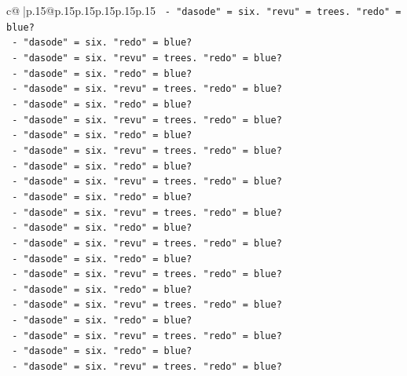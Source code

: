\documentclass{article}
\begin{document}
{\begin{supertabular}{c@{$\;$}|p{.15\linewidth}@{}p{.15\linewidth}p{.15\linewidth}p{.15\linewidth}p{.15\linewidth}p{.15\linewidth}}
{{{\texttt{                    {-} "dasode" = six. "revu" = trees. "redo" = blue?} \\
\texttt{                    {-} "dasode" = six. "redo" = blue?} \\
\texttt{                    {-} "dasode" = six. "revu" = trees. "redo" = blue?} \\
\texttt{                    {-} "dasode" = six. "redo" = blue?} \\
\texttt{                    {-} "dasode" = six. "revu" = trees. "redo" = blue?} \\
\texttt{                    {-} "dasode" = six. "redo" = blue?} \\
\texttt{                    {-} "dasode" = six. "revu" = trees. "redo" = blue?} \\
\texttt{                    {-} "dasode" = six. "redo" = blue?} \\
\texttt{                    {-} "dasode" = six. "revu" = trees. "redo" = blue?} \\
\texttt{                    {-} "dasode" = six. "redo" = blue?} \\
\texttt{                    {-} "dasode" = six. "revu" = trees. "redo" = blue?} \\
\texttt{                    {-} "dasode" = six. "redo" = blue?} \\
\texttt{                    {-} "dasode" = six. "revu" = trees. "redo" = blue?} \\
\texttt{                    {-} "dasode" = six. "redo" = blue?} \\
\texttt{                    {-} "dasode" = six. "revu" = trees. "redo" = blue?} \\
\texttt{                    {-} "dasode" = six. "redo" = blue?} \\
\texttt{                    {-} "dasode" = six. "revu" = trees. "redo" = blue?} \\
\texttt{                    {-} "dasode" = six. "redo" = blue?} \\
\texttt{                    {-} "dasode" = six. "revu" = trees. "redo" = blue?} \\
\texttt{                    {-} "dasode" = six. "redo" = blue?} \\
\texttt{                    {-} "dasode" = six. "revu" = trees. "redo" = blue?} \\
\texttt{                    {-} "dasode" = six. "redo" = blue?} \\
\texttt{                    {-} "dasode" = six. "revu" = trees. "redo" = blue?} \\
}}}
\end{supertabular}}
\end{document}
